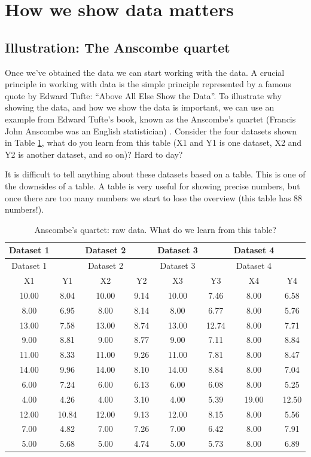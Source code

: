 \documentclass[]{book}
\begin{document}
\hypertarget{how-we-show-data-matters}{%
\section{How we show data matters}\label{how-we-show-data-matters}}

\hypertarget{illustration-the-anscombe-quartet}{%
\subsection{Illustration: The Anscombe quartet}\label{illustration-the-anscombe-quartet}}

Once we've obtained the data we can start working with the data. A crucial principle in working with data is the simple principle represented by a famous quote by Edward Tufte: ``Above All Else Show the Data''. To illustrate why showing the data, and how we show the data is important, we can use an example from Edward Tufte's book, known as the Anscombe's quartet (Francis John Anscombe was an English statistician) \citep{tufte2001visual}. Consider the four datasets shown in Table \ref{tab:viz1}, what do you learn from this table (X1 and Y1 is one dataset, X2 and Y2 is another dataset, and so on)? Hard to day?

It is difficult to tell anything about these datasets based on a table. This is one of the downsides of a table. A table is very useful for showing precise numbers, but once there are too many numbers we start to lose the overview (this table has 88 numbers!).

\begin{longtable}[]{@{}cccccccc@{}}
\caption{\label{tab:viz1} Anscombe's quartet: raw data. What do we learn from this table?}\tabularnewline
\toprule
Dataset 1 & & Dataset 2 & & Dataset 3 & & Dataset 4 &\tabularnewline
\midrule
\endfirsthead
\toprule
Dataset 1 & & Dataset 2 & & Dataset 3 & & Dataset 4 &\tabularnewline
\midrule
\endhead
X1 & Y1 & X2 & Y2 & X3 & Y3 & X4 & Y4\tabularnewline
10.00 & 8.04 & 10.00 & 9.14 & 10.00 & 7.46 & 8.00 & 6.58\tabularnewline
8.00 & 6.95 & 8.00 & 8.14 & 8.00 & 6.77 & 8.00 & 5.76\tabularnewline
13.00 & 7.58 & 13.00 & 8.74 & 13.00 & 12.74 & 8.00 & 7.71\tabularnewline
9.00 & 8.81 & 9.00 & 8.77 & 9.00 & 7.11 & 8.00 & 8.84\tabularnewline
11.00 & 8.33 & 11.00 & 9.26 & 11.00 & 7.81 & 8.00 & 8.47\tabularnewline
14.00 & 9.96 & 14.00 & 8.10 & 14.00 & 8.84 & 8.00 & 7.04\tabularnewline
6.00 & 7.24 & 6.00 & 6.13 & 6.00 & 6.08 & 8.00 & 5.25\tabularnewline
4.00 & 4.26 & 4.00 & 3.10 & 4.00 & 5.39 & 19.00 & 12.50\tabularnewline
12.00 & 10.84 & 12.00 & 9.13 & 12.00 & 8.15 & 8.00 & 5.56\tabularnewline
7.00 & 4.82 & 7.00 & 7.26 & 7.00 & 6.42 & 8.00 & 7.91\tabularnewline
5.00 & 5.68 & 5.00 & 4.74 & 5.00 & 5.73 & 8.00 & 6.89\tabularnewline
\bottomrule
\end{longtable}
\end{document}
